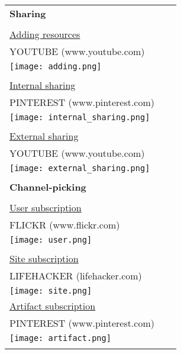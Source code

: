 \begin{longtable}{|p{0.90\linewidth}|}
\textbf{Sharing} \\
\\
\underline{Adding resources}         \\
YOUTUBE (www.youtube.com)\\
\texttt{[image: adding.png]}\\
\\
\underline{Internal sharing}         \\
PINTEREST (www.pinterest.com)\\
\texttt{[image: internal\_sharing.png]}\\
\\ 
\underline{External sharing}        \\ 
YOUTUBE (www.youtube.com)\\
\texttt{[image: external\_sharing.png]}\\
\\
\hline
\pagebreak
\hline  
\textbf{Channel-picking}  	 \\
\\
\underline{User subscription}        \\
FLICKR (www.flickr.com)\\
\texttt{[image: user.png]}\\
\\
\underline{Site subscription}  	\\
LIFEHACKER (lifehacker.com)\\
\texttt{[image: site.png]}\\
\underline{Artifact subscription}       \\
PINTEREST (www.pinterest.com)\\
\texttt{[image: artifact.png]}\\
\\


\hline        

\end{longtable}